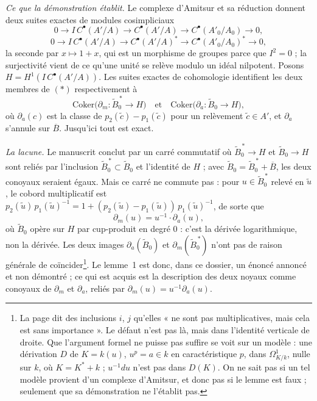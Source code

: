 \documentclass[11pt,a4paper]{article}
\begin{document}
\emph{Ce que la démonstration établit.} Le complexe d'Amitsur et sa
réduction donnent deux suites exactes de modules cosimpliciaux
\[
  0 \to I\,C^{\bullet}(A'/A) \to C^{\bullet}(A'/A) \to C^{\bullet}(A'_0/A_0)
  \to 0 ,
\]
\[
  0 \to I\,C^{\bullet}(A'/A) \to C^{\bullet}(A'/A)^{*} \to
  C^{\bullet}(A'_0/A_0)^{*} \to 0 ,
\]
la seconde par $x \mapsto 1 + x$, qui est un morphisme de groupes parce que
$I^2 = 0$ ; la surjectivité vient de ce qu'une unité se relève modulo un
idéal nilpotent. Posons $H = H^1(I\,C^{\bullet}(A'/A))$. Les suites exactes
de cohomologie identifient les deux membres de $(*)$ respectivement à
\[
  \mathrm{Coker}\bigl(\partial_m : \widetilde{B}_0^{\,*} \to H\bigr)
  \quad \text{et} \quad
  \mathrm{Coker}\bigl(\partial_a : \widetilde{B}_0 \to H\bigr) ,
\]
où $\partial_a(c)$ est la classe de $p_2(\tilde{c}) - p_1(\tilde{c})$ pour un
relèvement $\tilde{c} \in A'$, et $\partial_a$ s'annule sur $\overline{B}$.
Jusqu'ici tout est exact.

\emph{La lacune.} Le manuscrit conclut par un carré commutatif où
$\widetilde{B}_0^{\,*} \to H$ et $\widetilde{B}_0 \to H$ sont reliés par
l'inclusion $\widetilde{B}_0^{\,*} \subset \widetilde{B}_0$ et l'identité de
$H$ ; avec $\widetilde{B}_0 = \widetilde{B}_0^{\,*} + \overline{B}$, les deux
conoyaux seraient égaux. Mais ce carré ne commute pas : pour $u \in
\widetilde{B}_0^{\,*}$ relevé en $\tilde{u}$, le cobord multiplicatif est
$p_2(\tilde{u})\, p_1(\tilde{u})^{-1} = 1 + (p_2(\tilde{u}) -
p_1(\tilde{u}))\, p_1(\tilde{u})^{-1}$, de sorte que
\[
  \partial_m(u) = u^{-1} \cdot \partial_a(u) ,
\]
où $\widetilde{B}_0$ opère sur $H$ par cup-produit en degré $0$ : c'est la
dérivée logarithmique, non la dérivée. Les deux images $\partial_a(
\widetilde{B}_0)$ et $\partial_m(\widetilde{B}_0^{\,*})$ n'ont pas de raison
générale de coïncider\footnote{La page dit des inclusions $i$, $j$ qu'elles
« ne sont pas multiplicatives, mais cela est sans importance ». Le défaut
n'est pas là, mais dans l'identité verticale de droite. Que l'argument formel
ne puisse pas suffire se voit sur un modèle : une dérivation $D$ de $K =
k(u)$, $u^p = a \in k$ en caractéristique $p$, dans $\Omega^1_{K/k}$, nulle
sur $k$, où $K = K^* + k$ ; $u^{-1}du$ n'est pas dans $D(K)$. On ne sait pas
si un tel modèle provient d'un complexe d'Amitsur, et donc pas si le lemme
est faux ; seulement que sa démonstration ne l'établit pas.}. Le lemme~1 est
donc, dans ce dossier, un énoncé annoncé et non démontré ; ce qui est acquis
est la description des deux noyaux comme conoyaux de $\partial_m$ et
$\partial_a$, reliés par $\partial_m(u) = u^{-1}\partial_a(u)$.
\end{document}
